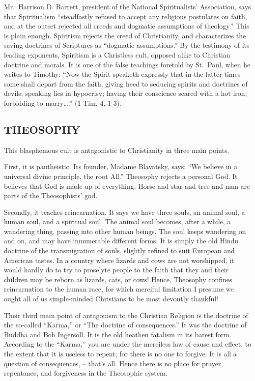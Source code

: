 \documentclass[
]{book}
\begin{document}
Mr.~Harrison D. Barrett, president of the National Spiritualists' Association, says that Spiritualism ``steadfastly refused to accept any religious postulates on faith, and at the outset rejected all creeds and dogmatic assumptions of theology.'' This is plain enough. Spiritism rejects the creed of Christianity, and characterizes the saving doctrines of Scriptures as ``dogmatic assumptions.'' By the testimony of its leading exponents, Spiritism is a Christless cult, opposed alike to Christian doctrine and morals. It is one of the false teachings foretold by St.~Paul, when he writes to Timothy: ``Now the Spirit speaketh expressly that in the latter times some shall depart from the faith, giving heed to seducing spirits and doctrines of devils; speaking lies in hypocrisy; having their conscience seared with a hot iron; forbidding to marry\ldots.'' (1 Tim. 4, 1-3).

\subsection{THEOSOPHY}\label{theosophy}

This blasphemous cult is antagonistic to Christianity in three main points.

First, it is pantheistic. Its founder, Madame Blavatsky, says: ``We believe in a universal divine principle, the root All.'' Theosophy rejects a personal God. It believes that God is made up of everything. Horse and star and tree and man are parts of the Theosophists' god.

Secondly, it teaches reincarnation. It says we have three souls, an animal soul, a human soul, and a spiritual soul. The animal soul becomes, after a while, a wandering thing, passing into other human beings. The soul keeps wandering on and on, and may have innumerable different forms. It is simply the old Hindu doctrine of the transmigration of souls, slightly refined to suit European and American tastes. In a country where lizards and cows are not worshipped, it would hardly do to try to proselyte people to the faith that they and their children may be reborn as lizards, cats, or cows! Hence, Theosophy confines reincarnation to the human race, for which merciful limitation I presume we ought all of us simple-minded Christians to be most devoutly thankful!

Their third main point of antagonism to the Christian Religion is the doctrine of the so-called ``Karma,'' or ``The doctrine of consequences.'' It was the doctrine of Buddha and Bob Ingersoll. It is the old heathen fatalism in its barest form. According to the ``Karma,'' you are under the merciless law of cause and effect, to the extent that it is useless to repent; for there is no one to forgive. It is all a question of consequences, -- that's all. Hence there is no place for prayer, repentance, and forgiveness in the Theosophic system.
\end{document}
